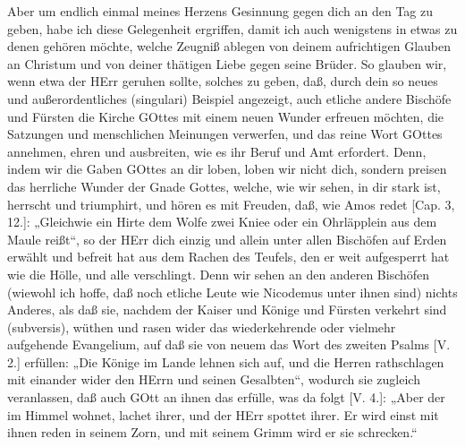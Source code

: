 Aber um endlich einmal meines Herzens Gesinnung gegen dich an den Tag zu geben, habe ich diese Gelegenheit ergriffen, damit ich auch wenigstens in etwas zu denen gehören möchte, welche Zeugniß ablegen von deinem aufrichtigen Glauben an Christum und von deiner thätigen Liebe gegen seine Brüder. So glauben wir, wenn etwa der HErr geruhen sollte, solches zu
geben, daß, durch dein so neues und außerordentliches (singulari) Beispiel angezeigt, auch etliche andere Bischöfe und Fürsten die Kirche GOttes mit einem neuen Wunder erfreuen möchten, die Satzungen und menschlichen Meinungen verwerfen, und das reine Wort GOttes annehmen, ehren und ausbreiten, wie es ihr Beruf und Amt erfordert. Denn, indem wir die Gaben GOttes an dir loben, loben wir nicht dich, sondern preisen das herrliche Wunder der Gnade Gottes, welche, wie wir sehen, in dir stark ist, herrscht und triumphirt, und hören es mit Freuden, daß, wie Amos redet [Cap. 3, 12.]: „Gleichwie ein Hirte dem Wolfe zwei Kniee oder ein Ohrläpplein aus dem Maule reißt“, so der HErr dich einzig und allein unter allen Bischöfen auf Erden erwählt und befreit hat aus dem Rachen des Teufels, den er weit aufgesperrt hat wie die Hölle, und alle verschlingt. Denn wir sehen an den anderen Bischöfen (wiewohl ich hoffe, daß noch etliche Leute wie Nicodemus unter ihnen sind) nichts Anderes, als daß sie, nachdem der Kaiser und Könige und Fürsten verkehrt sind (subversis), wüthen und rasen wider das wiederkehrende oder vielmehr aufgehende Evangelium, auf daß sie von neuem das Wort des zweiten Psalms [V. 2.] erfüllen: „Die Könige im Lande lehnen sich auf, und die Herren rathschlagen mit einander wider den HErrn und seinen Gesalbten“, wodurch sie zugleich veranlassen, daß auch GOtt an ihnen das erfülle, was da folgt [V. 4.]: „Aber der im Himmel wohnet, lachet ihrer, und der HErr spottet ihrer. Er wird einst mit ihnen reden in seinem Zorn, und mit seinem Grimm wird er sie schrecken.“

